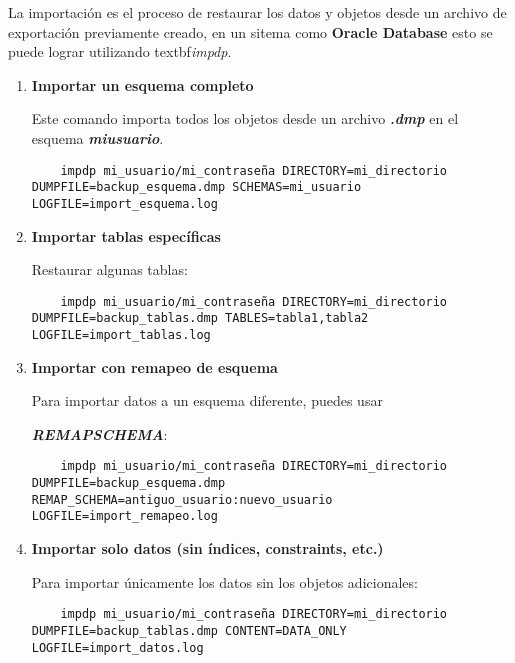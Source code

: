 La importación es el proceso de restaurar los datos y objetos desde un archivo de exportación previamente creado, en un sitema como \textbf{Oracle Database} esto se puede lograr utilizando textbf{\emph{impdp}}.

\begin{enumerate}
  \item \textbf{Importar un esquema completo}
  
  Este comando importa todos los objetos desde un archivo \textbf{\emph{.dmp}} en el esquema \textbf{\emph{mi{\textunderscore}usuario}}.

  \begin{lstlisting}
    impdp mi_usuario/mi_contraseña DIRECTORY=mi_directorio DUMPFILE=backup_esquema.dmp SCHEMAS=mi_usuario LOGFILE=import_esquema.log
  \end{lstlisting}

  \item \textbf{Importar tablas específicas}
  
  Restaurar algunas tablas:

  \begin{lstlisting}
    impdp mi_usuario/mi_contraseña DIRECTORY=mi_directorio DUMPFILE=backup_tablas.dmp TABLES=tabla1,tabla2 LOGFILE=import_tablas.log
  \end{lstlisting}

  \item \textbf{Importar con remapeo de esquema}
  
  Para importar datos a un esquema diferente, puedes usar 
  
  \textbf{\emph{REMAP{\textunderscore}SCHEMA}}:

  \begin{lstlisting}
    impdp mi_usuario/mi_contraseña DIRECTORY=mi_directorio DUMPFILE=backup_esquema.dmp REMAP_SCHEMA=antiguo_usuario:nuevo_usuario LOGFILE=import_remapeo.log
  \end{lstlisting}

  \item \textbf{Importar solo datos (sin índices, constraints, etc.)}
  
  Para importar únicamente los datos sin los objetos adicionales:

  \begin{lstlisting}
    impdp mi_usuario/mi_contraseña DIRECTORY=mi_directorio DUMPFILE=backup_tablas.dmp CONTENT=DATA_ONLY LOGFILE=import_datos.log
  \end{lstlisting}
\end{enumerate}